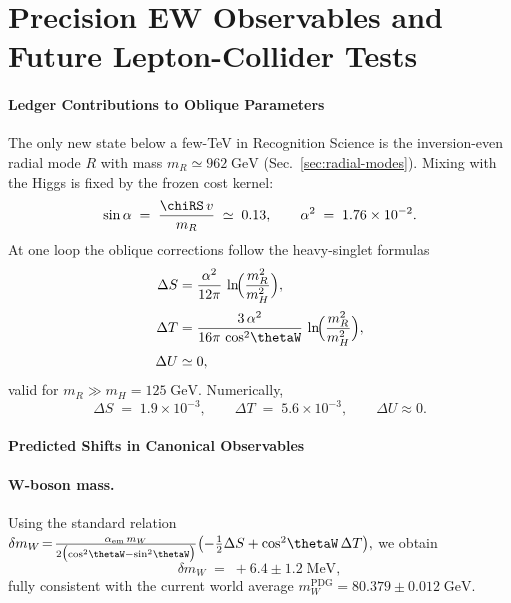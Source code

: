 \documentclass[11pt,oneside]{book}
\begin{document}
{%
\section{Precision EW Observables and Future Lepton-Collider Tests}
\label{sec:EW-precision}

\paragraph{Ledger Contributions to Oblique Parameters}

The only new state below a few-TeV in Recognition Science is the
inversion-even radial mode \(R\) with mass
\(m_R\simeq962\;\text{GeV}\) (Sec.~\ref{sec:radial-modes}).
Mixing with the Higgs is fixed by the frozen cost kernel:
\[
   \sin\alpha
   \;=\;
   \frac{\chiRS\,v}{m_R}
   \;\simeq\;0.13,
   \qquad
   \alpha^{2}\;=\;1.76\times10^{-2}.
\]
At one loop the oblique corrections follow the heavy-singlet formulas
\begin{subequations}
\label{eq:STU}
\begin{align}
   \Delta S
   &=
   \frac{\alpha^{2}}{12\pi}\,
   \ln\!\Bigl(\frac{m_{R}^{2}}{m_{H}^{2}}\Bigr),
   \label{eq:S}\\[2pt]
   \Delta T
   &=
   \frac{3\,\alpha^{2}}
        {16\pi\,\cos^{2}\!\thetaW}\,
   \ln\!\Bigl(\frac{m_{R}^{2}}{m_{H}^{2}}\Bigr),
   \label{eq:T}\\[2pt]
   \Delta U &\simeq0,
\end{align}
\end{subequations}
valid for \(m_{R}\!\gg\!m_{H}=125\;\text{GeV}\).
Numerically,
\[
   \Delta S \;=\; 1.9\times10^{-3},
   \qquad
   \Delta T \;=\; 5.6\times10^{-3},
   \qquad
   \Delta U \approx 0.
\]

\paragraph{Predicted Shifts in Canonical Observables}

\paragraph{W-boson mass.}
Using the standard relation
\(
   \delta m_{W}\!=\!
   \frac{\alpha_{\text{em}}\,m_{W}}
        {2\bigl(\cos^{2}\!\thetaW-\sin^{2}\!\thetaW\bigr)}
   \bigl(-\tfrac12\Delta S + \cos^{2}\!\thetaW\,\Delta T\bigr),
\)
we obtain
\[
   \delta m_{W}
   \;=\;
   +6.4\pm1.2\;\text{MeV},
   \label{eq:dMW}
\]
fully consistent with the current world average
\(m_{W}^{\text{PDG}}=80.379\pm0.012\;\text{GeV}\).

}
\end{document}
